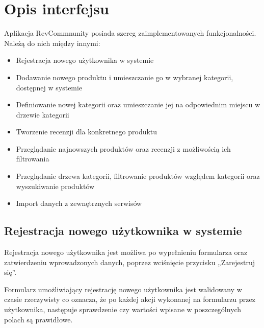 \chapter{Opis interfejsu}

Aplikacja RevCommnunity posiada szereg zaimplementowanych funkcjonalności. Należą do nich między innymi:

\begin{itemize}
\item Rejestracja nowego użytkownika w systemie
\item Dodawanie nowego produktu i umieszczanie go w wybranej kategorii, dostępnej w systemie
\item Definiowanie nowej kategorii oraz umieszczanie jej na odpowiednim miejscu w drzewie kategorii
\item Tworzenie recenzji dla konkretnego produktu
\item Przeglądanie najnowszych produktów oraz recenzji z możliwością ich filtrowania
\item Przeglądanie drzewa kategorii, filtrowanie produktów względem kategorii oraz wyszukiwanie produktów
\item Import danych z zewnętrznych serwisów
\end{itemize}

\section{Rejestracja nowego użytkownika w systemie}

Rejestracja nowego użytkownika jest możliwa po wypełnieniu formularza oraz zatwierdzeniu wprowadzonych danych, poprzez wciśnięcie przycisku „Zarejestruj się”.

Formularz umożliwiający rejestrację nowego użytkownika jest walidowany w czasie rzeczywisty co oznacza, że po każdej akcji wykonanej na formularzu przez użytkownika, następuje sprawdzenie czy wartości wpisane w poszczególnych polach są prawidłowe.

